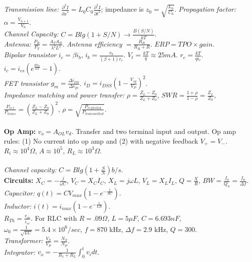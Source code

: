 \emph{Transmission line:}
${\frac {\partial^2 I} {{\partial x}^2}} = L_0 C_0 {\frac {\partial^2 I} {{\partial t}^2}}$;
impedance is $z_0 = {\sqrt {\frac {L_0} {C_0}}}$.
\emph{Propagation factor:}
$\alpha= {\frac {V_{n+1}} {V_n}}$.  \\
\emph{Channel Capacity:} $C= B lg(1+S/N) \rightarrow {\frac {B (S/N)} {kT}}$. \\
\emph{Antenna:} ${\frac {P_R} {P_T}}= {\frac {A_T A_R} {\lambda^2 L^2}}$.
\emph{Antenna efficiency} $= {\frac {R_R} {R_R+R}}$.
$ERP= TPO \times gain$.\\
\emph{Bipolar transistor} $i_c= \beta i_b$, $i_b = {\frac {v_b}{(\beta + 1)r_e}}$. 
$V_t= {\frac {kT}q} \approx 25mA$.  $r_e= {\frac {kT}{q i_c}}$.
$i_c= i_{cs} (e^{\frac {qv_{be}} {kT}} -1)$.
\\
\emph{FET transistor} $g_m = {\frac {\Delta i_{DS}} {\Delta v_{gs}}}$.  $i_D = i_{DSS} (1-{\frac {V_{sg}} {V_P}})^2$.
\\
\emph{Impedance matching and power transfer:}
$\rho={\frac {Z_L-Z_0} {Z_L+Z_0}}$, 
$SWR= {\frac {1+\rho} {1-\rho}}= {\frac {Z_L}{Z_0}}$,
${\frac {P_{ref}} {P_{trans}}}= ({\frac {Z_L-Z_0} {Z_L+Z_0}})^2$,
$\rho= {\sqrt {\frac {P_{reflected}} {P_{transmitted}}}}$.
\\
\\
{\bf Op Amp:} $ v_o= A_{OL}v_d$.  Transfer and two terminal input and output.
Op amp rules: (1) No current into op amp and
(2) with negative feedback $V_+ = V_-$.
$R_i \approx 10^4 \Omega$, $A \approx 10^5$, $R_L \approx 10^3 \Omega$.    
\\
\\
\emph{Channel capacity:} $C= B lg(1+{\frac S N}) b/s$.
\\
{\bf Circuits:}
$X_C= -{\frac j {\omega C}}$, $V_C= X_C I_C$,
$X_L=  j \omega L$, $V_L= X_L I_L$,
$Q= {\frac X R}$, $BW= {\frac {f_0} {Q_u}} =
{\frac {f_0} {\Delta f}}$. \\
\emph{Capacitor:} $q(t)= C V_{max} (1-e^{- {\frac t {RC}}})$. \\
\emph{Inductor:} $i(t)= i_{max} (1-e^{- {\frac t {LR}}})$. \\
$R_{Th}= {\frac {v_{oc}} {i_{sc}}}$.
For RLC with $R=.09 \Omega$, $L= 5 \mu F$, $C= 6.693 nF$,
$\omega_0 = {\frac 1 {\sqrt {LC}}}= 5.4 \times 10^6 /sec$, $f= 870$ kHz, $\Delta f= 2.9$ kHz,
$Q= 300$.   \\
\emph{Transformer:} ${\frac {V_S}{V_P}}= {\frac {N_S}{N_P}}$. \\
\emph{Integrator:} $v_o= - {\frac 1 {R_1+R_L}} \int_0^t v_i dt$. \\
